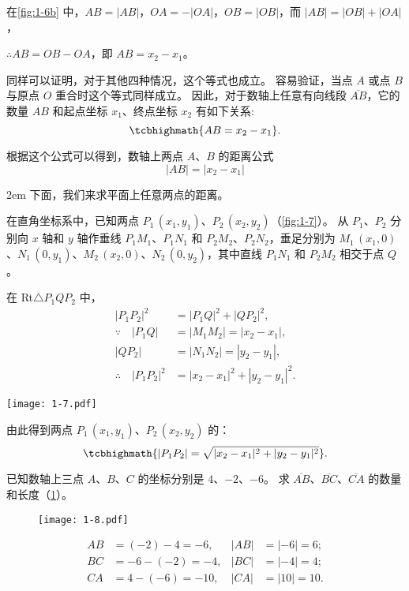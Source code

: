 在\cref{fig:1-6b} 中，$AB=|AB|$，$OA=-|OA|$，$OB=|OB|$，而 $|AB|=|OB|+|OA|$，

$\therefore AB=OB-OA$，即 $AB=x_2-x_1$。

同样可以证明，对于其他四种情况，这个等式也成立。
容易验证，当点 $A$ 或点 $B$ 与原点 $O$ 重合时这个等式同样成立。
因此，对于数轴上任意有向线段 $\overline{AB}$，它的数量 $AB$ 和起点坐标 $x_1$、终点坐标 $x_2$ 有如下关系:
\[ \tcbhighmath{AB = x_2 - x_1}. \]

根据这个公式可以得到，数轴上两点 $A$、$B$ 的距离公式
\[ |AB| = |x_2 - x_1| \]

\medskip\noindent
\begin{minipage}{0.67\linewidth}\parindent2em
下面，我们来求平面上任意两点的距离。

在直角坐标系中，已知两点 $P_1\,(x_1,y_1)$、$P_2\,(x_2,y_2)$（\cref{fig:1-7}）。
从 $P_1$、$P_2$ 分别向 $x$ 轴和 $y$ 轴作垂线 $P_1M_1$、$P_1N_1$ 和 $P_2M_2$、$P_2N_2$，垂足分别为 $M_1\,(x_1,0)$、$N_1\,(0,y_1)$、$M_2\,(x_2,0)$、$N_2\,(0,y_2)$，其中直线 $P_1N_1$ 和 $P_2M_2$ 相交于点 $Q$。

在 Rt$\triangle P_1QP_2$ 中，
\begin{align*}
  |P_1P_2|^2 & = |P_1Q|^2+|QP_2|^2,\\
  \because \quad |P_1Q| &= |M_1M_2|=|x_2-x_1|,\\
  |QP_2| & = |N_1N_2|=|y_2-y_1|,\\
  \therefore \quad |P_1P_2|^2 &= |x_2-x_1|^2+|y_2-y_1|^2.
\end{align*}
\end{minipage}\hfill
\begin{minipage}{0.28\linewidth}\centering
\begin{figurehere}
  \texttt{[image: 1-7.pdf]}
  \caption{}\label{fig:1-7}
\end{figurehere}
\end{minipage}

由此得到两点 $P_1\,(x_1,y_1)$、$P_2\,(x_2,y_2)$ 的：
\[ \tcbhighmath{|P_1P_2| = \sqrt{|x_2-x_1|^2+|y_2-y_1|^2}}. \]

\begin{example}
已知数轴上三点 $A$、$B$、$C$ 的坐标分别是 $4$、$-2$、$-6$。
求 $\overline{AB}$、$\overline{BC}$、$\overline{CA}$ 的数量和长度（\cref{fig:1-8}）。
\end{example}
\begin{figure}
  \texttt{[image: 1-8.pdf]}
  \caption{}\label{fig:1-8}
\end{figure}
\begin{solution}
  \begin{align*}
    AB & = (-2)-4=-6,   & |AB| &=|-6|=6;\\
    BC & = -6-(-2)=-4,  & |BC| &=|-4|=4;\\
    CA & = 4-(-6)=-10,  & |CA| &=|10|=10.
  \end{align*}
\end{solution}

